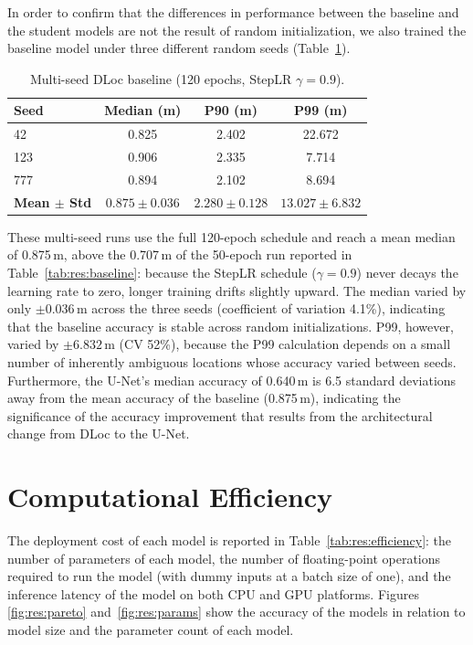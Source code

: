 In order to confirm that the differences in performance between the baseline and the student models are
not the result of random initialization, we also trained the baseline model under three different random
seeds (Table~\ref{tab:res:multiseed}).

\begin{table}[H]
\centering
\caption{Multi-seed DLoc baseline (120 epochs, StepLR $\gamma = 0.9$).}
\label{tab:res:multiseed}
\begin{tabular}{@{}lccc@{}}
\toprule
\textbf{Seed} & \textbf{Median (m)} & \textbf{P90 (m)} & \textbf{P99 (m)} \\
\midrule
42  & 0.825 & 2.402 & 22.672 \\
123 & 0.906 & 2.335 &  7.714 \\
777 & 0.894 & 2.102 &  8.694 \\
\midrule
\textbf{Mean $\pm$ Std} & $\mathbf{0.875 \pm 0.036}$ & $\mathbf{2.280 \pm 0.128}$ & $\mathbf{13.027 \pm 6.832}$ \\
\bottomrule
\end{tabular}
\end{table}

These multi-seed runs use the full 120-epoch schedule and reach a mean median of 0.875\,m, above the
0.707\,m of the 50-epoch run reported in Table~\ref{tab:res:baseline}: because the StepLR schedule
($\gamma = 0.9$) never decays the learning rate to zero, longer training drifts slightly upward. The
median varied by only $\pm 0.036$\,m across the three seeds (coefficient of variation 4.1\%), indicating
that the baseline accuracy is stable across random initializations. P99, however, varied by $\pm 6.832$\,m (CV 52\%), because the P99
calculation depends on a small number of inherently ambiguous locations whose accuracy varied between
seeds. Furthermore, the U-Net's median accuracy of 0.640\,m is 6.5 standard deviations away from the mean
accuracy of the baseline (0.875\,m), indicating the significance of the accuracy improvement that results
from the architectural change from DLoc to the U-Net.

\section{Computational Efficiency}
\label{sec:res:efficiency}

The deployment cost of each model is reported in Table~\ref{tab:res:efficiency}: the number of parameters
of each model, the number of floating-point operations required to run the model (with dummy inputs at a
batch size of one), and the inference latency of the model on both CPU and GPU platforms. Figures
\ref{fig:res:pareto} and~\ref{fig:res:params} show the accuracy of the models in relation to model size
and the parameter count of each model.

